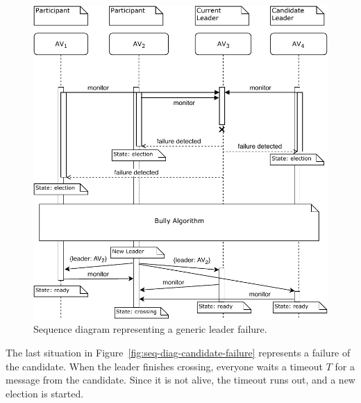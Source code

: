 \documentclass{memoir}
\begin{document}
\begin{figure}
	\centering
	\includegraphics[width=\linewidth]{sequence_diagrams/leader_sw_failure.pdf}
	\caption{Sequence diagram representing a generic leader failure.}
	\label{fig:seq-diag-leader-sw-failure}
\end{figure}

The last situation in Figure~\ref{fig:seq-diag-candidate-failure} represents a failure of the candidate. When the leader finishes crossing, everyone waits a timeout $T$ for a message from the candidate. Since it is not alive, the timeout runs out, and a new election is started.
\end{document}
